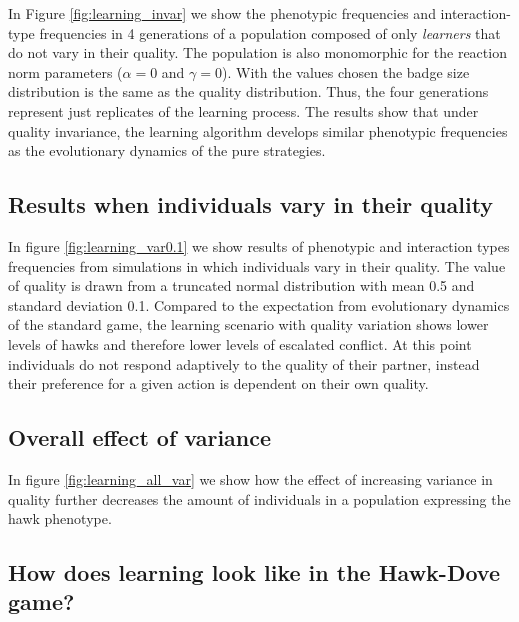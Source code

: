 \documentclass[
]{article}
\begin{document}
In Figure \ref{fig:learning_invar} we show the phenotypic frequencies
and interaction-type frequencies in 4 generations of a population
composed of only \emph{learners} that do not vary in their quality. The
population is also monomorphic for the reaction norm parameters
(\(\alpha=0\) and \(\gamma=0\)). With the values chosen the badge size
distribution is the same as the quality distribution. Thus, the four
generations represent just replicates of the learning process. The
results show that under quality invariance, the learning algorithm
develops similar phenotypic frequencies as the evolutionary dynamics of
the pure strategies.

\hypertarget{results-when-individuals-vary-in-their-quality}{%
\subsection{Results when individuals vary in their
quality}\label{results-when-individuals-vary-in-their-quality}}

In figure \ref{fig:learning_var0.1} we show results of phenotypic and
interaction types frequencies from simulations in which individuals vary
in their quality. The value of quality is drawn from a truncated normal
distribution with mean 0.5 and standard deviation 0.1. Compared to the
expectation from evolutionary dynamics of the standard game, the
learning scenario with quality variation shows lower levels of hawks and
therefore lower levels of escalated conflict. At this point individuals
do not respond adaptively to the quality of their partner, instead their
preference for a given action is dependent on their own quality.

\hypertarget{overall-effect-of-variance}{%
\subsection{Overall effect of
variance}\label{overall-effect-of-variance}}

In figure \ref{fig:learning_all_var} we show how the effect of
increasing variance in quality further decreases the amount of
individuals in a population expressing the hawk phenotype.

\hypertarget{how-does-learning-look-like-in-the-hawk-dove-game}{%
\subsection{How does learning look like in the Hawk-Dove
game?}\label{how-does-learning-look-like-in-the-hawk-dove-game}}
\end{document}
